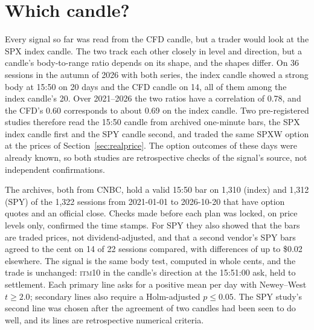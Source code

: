 \documentclass[12pt,letterpaper]{article}
\newcommand{\ITM}[1]{\textsc{itm}#1}
\begin{document}
\section{Which candle?}
\label{sec:source}



Every signal so far was read from the CFD candle, but a trader would look at
the SPX index candle. The two track each other closely in level and direction, but a
candle's body-to-range ratio depends on its shape, and the shapes differ. On 36
sessions in the autumn of 2026 with both series, the index candle showed a strong
body at 15:50 on 20 days and the CFD candle on 14, all of them among the index
candle's 20. Over 2021--2026 the two ratios have a correlation of 0.78, and the
CFD's 0.60 corresponds to about 0.69 on the index candle. Two pre-registered
studies therefore read the 15:50 candle from archived one-minute bars, the SPX
index candle first and the SPY candle second, and traded the same SPXW option at
the prices of Section~\ref{sec:realprice}. The option outcomes of these days were
already known, so both studies are retrospective checks of the signal's source,
not independent confirmations.

The archives, both from CNBC, hold a valid 15:50 bar on 1{,}310 (index) and
1{,}312 (SPY) of the 1{,}322 sessions from 2021-01-01 to 2026-10-20 that have
option quotes and an official close. Checks made before each plan was locked, on
price levels only, confirmed the time stamps. For SPY they also showed that the
bars are traded prices, not dividend-adjusted, and that a second vendor's SPY
bars agreed to the cent on 14 of 22 sessions compared, with differences of up to
\$0.02 elsewhere. The signal is the same body test, computed in whole cents, and
the trade is unchanged: \ITM{10} in the candle's direction at the 15:51:00 ask,
held to settlement. Each primary line asks for a positive mean per day with
Newey--West $t \ge 2.0$; secondary lines also require a Holm-adjusted
$p \le 0.05$. The SPY study's second line was chosen after the agreement of two
candles had been seen to do well, and its lines are retrospective numerical
criteria.
\end{document}
